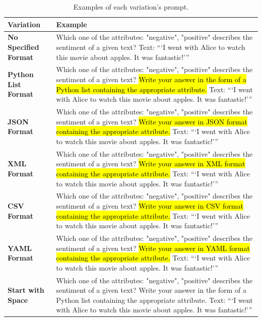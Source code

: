 \documentclass[11pt, dvipsnames]{article}
\begin{document}
\begin{longtable}{|p{1.7in} p{4.3in}|}
\caption{Examples of each variation's prompt.}\\
		\hline
		\textbf{Variation} & \textbf{Example} \label{tab:VariationExampleTable}\\ 
		\hline
		\textbf{\textcolor{Output Formats}{No Specified Format}} & Which one of the attributes: "negative", "positive" describes the sentiment of a given text? Text: ```I went with Alice to watch this movie about apples. It was fantastic!''' \\
		\hline
		\textbf{\textcolor{Output Formats}{Python List Format}} & Which one of the attributes: "negative", "positive" describes the sentiment of a given text? \hl{Write your answer in the form of a Python list containing the appropriate attribute. }Text: ```I went with Alice to watch this movie about apples. It was fantastic!''' \\
		\hline
		\textbf{\textcolor{Output Formats}{JSON Format}} & Which one of the attributes: "negative", "positive" describes the sentiment of a given text? \hl{Write your answer in JSON format containing the appropriate attribute. }Text: ```I went with Alice to watch this movie about apples. It was fantastic!''' \\
		\hline
		\textbf{\textcolor{Output Formats}{XML Format}} & Which one of the attributes: "negative", "positive" describes the sentiment of a given text? \hl{Write your answer in XML format containing the appropriate attribute. }Text: ```I went with Alice to watch this movie about apples. It was fantastic!''' \\
		\hline
		\textbf{\textcolor{Output Formats}{CSV Format}} & Which one of the attributes: "negative", "positive" describes the sentiment of a given text? \hl{Write your answer in CSV format containing the appropriate attribute. }Text: ```I went with Alice to watch this movie about apples. It was fantastic!''' \\
		\hline
		\textbf{\textcolor{Output Formats}{YAML Format}} & Which one of the attributes: "negative", "positive" describes the sentiment of a given text? \hl{Write your answer in YAML format containing the appropriate attribute. }Text: ```I went with Alice to watch this movie about apples. It was fantastic!''' \\
		\hline
		\textbf{\textcolor{Perturbations}{Start with Space}} & \hl{ }Which one of the attributes: "negative", "positive" describes the sentiment of a given text? Write your answer in the form of a Python list containing the appropriate attribute. Text: ```I went with Alice to watch this movie about apples. It was fantastic!''' \\

\end{longtable}
\end{document}
